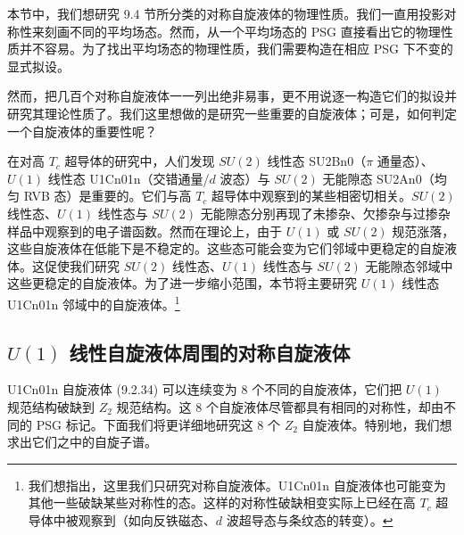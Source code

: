本节中，我们想研究 9.4 节所分类的对称自旋液体的物理性质。我们一直用投影对称性来刻画不同的平均场态。然而，从一个平均场态的 PSG 直接看出它的物理性质并不容易。为了找出平均场态的物理性质，我们需要构造在相应 PSG 下不变的显式拟设。

然而，把几百个对称自旋液体一一列出绝非易事，更不用说逐一构造它们的拟设并研究其理论性质了。我们这里想做的是研究一些重要的自旋液体；可是，如何判定一个自旋液体的重要性呢？

在对高 $T_{c}$ 超导体的研究中，人们发现 $SU(2)$ 线性态 SU2Bn0（$\pi$ 通量态）、$U(1)$ 线性态 U1Cn01n（交错通量/$d$ 波态）与 $SU(2)$ 无能隙态 SU2An0（均匀 RVB 态）是重要的。它们与高 $T_{c}$ 超导体中观察到的某些相密切相关。$SU(2)$ 线性态、$U(1)$ 线性态与 $SU(2)$ 无能隙态分别再现了未掺杂、欠掺杂与过掺杂样品中观察到的电子谱函数。然而在理论上，由于 $U(1)$ 或 $SU(2)$ 规范涨落，这些自旋液体在低能下是不稳定的。这些态可能会变为它们邻域中更稳定的自旋液体。这促使我们研究 $SU(2)$ 线性态、$U(1)$ 线性态与 $SU(2)$ 无能隙态邻域中这些更稳定的自旋液体。为了进一步缩小范围，本节将主要研究 $U(1)$ 线性态 U1Cn01n 邻域中的自旋液体。\footnote{我们想指出，这里我们只研究对称自旋液体。U1Cn01n 自旋液体也可能变为其他一些破缺某些对称性的态。这样的对称性破缺相变实际上已经在高 $T_{c}$ 超导体中被观察到（如向反铁磁态、$d$ 波超导态与条纹态的转变）。}

\subsection{$U(1)$ 线性自旋液体周围的对称自旋液体}

U1Cn01n 自旋液体 (9.2.34) 可以连续变为 8 个不同的自旋液体，它们把 $U(1)$ 规范结构破缺到 $Z_{2}$ 规范结构。这 8 个自旋液体尽管都具有相同的对称性，却由不同的 PSG 标记。下面我们将更详细地研究这 8 个 $Z_{2}$ 自旋液体。特别地，我们想求出它们之中的自旋子谱。

